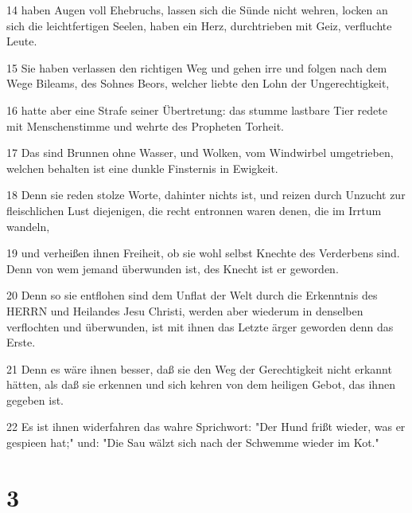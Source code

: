 \par 14 haben Augen voll Ehebruchs, lassen sich die Sünde nicht wehren, locken an sich die leichtfertigen Seelen, haben ein Herz, durchtrieben mit Geiz, verfluchte Leute.
\par 15 Sie haben verlassen den richtigen Weg und gehen irre und folgen nach dem Wege Bileams, des Sohnes Beors, welcher liebte den Lohn der Ungerechtigkeit,
\par 16 hatte aber eine Strafe seiner Übertretung: das stumme lastbare Tier redete mit Menschenstimme und wehrte des Propheten Torheit.
\par 17 Das sind Brunnen ohne Wasser, und Wolken, vom Windwirbel umgetrieben, welchen behalten ist eine dunkle Finsternis in Ewigkeit.
\par 18 Denn sie reden stolze Worte, dahinter nichts ist, und reizen durch Unzucht zur fleischlichen Lust diejenigen, die recht entronnen waren denen, die im Irrtum wandeln,
\par 19 und verheißen ihnen Freiheit, ob sie wohl selbst Knechte des Verderbens sind. Denn von wem jemand überwunden ist, des Knecht ist er geworden.
\par 20 Denn so sie entflohen sind dem Unflat der Welt durch die Erkenntnis des HERRN und Heilandes Jesu Christi, werden aber wiederum in denselben verflochten und überwunden, ist mit ihnen das Letzte ärger geworden denn das Erste.
\par 21 Denn es wäre ihnen besser, daß sie den Weg der Gerechtigkeit nicht erkannt hätten, als daß sie erkennen und sich kehren von dem heiligen Gebot, das ihnen gegeben ist.
\par 22 Es ist ihnen widerfahren das wahre Sprichwort: "Der Hund frißt wieder, was er gespieen hat;" und: "Die Sau wälzt sich nach der Schwemme wieder im Kot."

\chapter{3}

